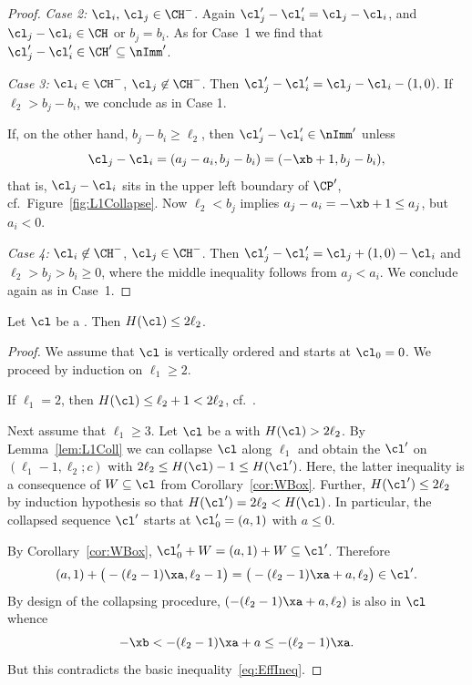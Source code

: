 \begin{proof}
{\em Case 2:} $\cl_i,\,\cl_j\in\CH^-$. Again $\cl_j'-\cl_i'=
\cl_j-\cl_i$, and $\cl_j-\cl_i\in\CH$ or 
$b_j=b_i$. As for Case~1 we find that $\cl_j'-\cl_i'\in\CH'
\subseteq\nImm'$.

{\em Case 3:} $\cl_i\in\CH^-$, $\cl_j\not\in\CH^-$. Then 
$\cl_j'-\cl_i'=\cl_j-\cl_i-(1,0)$. If $\ell_2>b_j-b_i$, we 
conclude as in Case 1. 

If, on the other hand, $b_j-b_i\geq\ell_2$, then $\cl_j'-\cl_i'
\in\nImm'$ unless
$$
\cl_j-\cl_i=(a_j-a_i,b_j-b_i)=(-\xb+1,b_j-b_i),
$$ 
that is, $\cl_j-\cl_i$ sits in the upper left boundary of $\CP'$,
cf.~Figure~\ref{fig:L1Collapse}. Now $\ell_2<b_j$ implies
$a_j-a_i=-\xb+1\leq a_j$, but $a_i<0$.

{\em Case 4:} $\cl_i\not\in\CH^-$, $\cl_j\in\CH^-$. Then 
$\cl_j'-\cl_i'=\cl_j+(1,0)-\cl_i$ and $\ell_2>b_j>b_i\geq0$,
where the middle inequality follows from $a_j<a_i$. 
We conclude again as in Case~1. 
\end{proof}

\begin{coro}
\label{cor:HeightConstraint}
Let $\cl$ be a {\mes}. Then $H(\cl)\leq2\ell_2$. 
\end{coro}

\begin{proof}
We assume that $\cl$ is vertically ordered and starts at 
$\cl_0=0$. We proceed by induction on $\ell_1\geq2$.

If $\ell_1=2$, then $H(\cl)\leq\ell_2+1<2\ell_2$, 
cf.\ .

Next assume that $\ell_1\geq3$. Let $\cl$ be a {\mes} with 
$H(\cl)>2\ell_2$. By Lemma~\ref{lem:L1Coll} we can 
collapse $\cl$ along $\ell_1$ and obtain the {\mes} $\cl'$ 
on $(\ell_1-1,\ell_2;c)$ with $2\ell_2\leq H(\cl)-1\leq H(\cl')$.
Here, the latter inequality is a consequence of 
$W\subseteq\cl$ from Corollary~\ref{cor:WBox}. 
Further, $H(\cl')\leq2\ell_2$ by induction hypothesis so that 
$H(\cl')=2\ell_2<H(\cl)$. In particular, the collapsed 
sequence $\cl'$ starts at $\cl_0'=(a,1)$ with $a\leq0$.

By Corollary~\ref{cor:WBox}, $\cl_0'+W=(a,1)+W\subseteq\cl'$. 
Therefore
$$
(a,1)+\big(-(\ell_2-1)\xa,\ell_2-1\big)=\big(-(\ell_2-1)\xa+a,\ell_2\big)\in\cl'.
$$
By design of the collapsing procedure, $(-(\ell_2-1)\xa+a,\ell_2)$ 
is also in $\cl$ whence 
$$
-\xb<-(\ell_2-1)\xa+a\leq-(\ell_2-1)\xa.
$$
But this contradicts the basic inequality~\eqref{eq:EffIneq}.
\end{proof}

